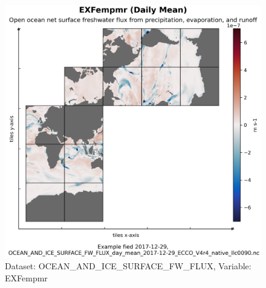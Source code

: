 \begin{figure}[H]
\centering
\includegraphics[scale=0.55]{../images/plots/native_plots/Ocean_and_Sea-Ice_Surface_Freshwater_Fluxes/EXFempmr.png}
\caption{Dataset: OCEAN\_AND\_ICE\_SURFACE\_FW\_FLUX, Variable: EXFempmr}
\label{tab:table-OCEAN_AND_ICE_SURFACE_FW_FLUX_EXFempmr-Plot}
\end{figure}
\pagebreak
